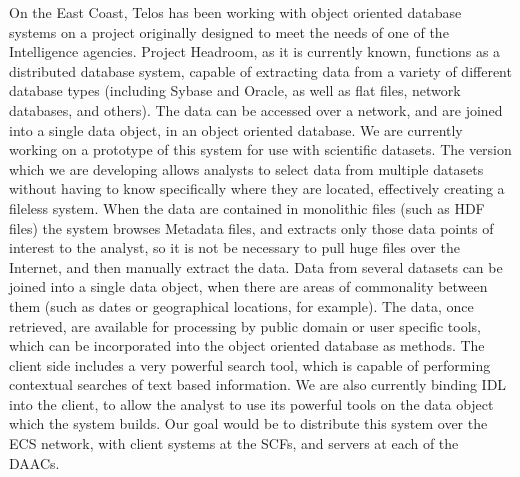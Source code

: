   	On the East Coast, Telos has been working with object oriented
  database systems on a project originally designed to meet the needs of one
  of the Intelligence agencies.  Project Headroom, as it is currently known,
  functions as a distributed database system, capable of extracting data from
  a variety of different database types (including Sybase and Oracle, as well
  as flat files, network databases, and others). The data can be accessed
  over a network, and are joined into a single data object, in an object
  oriented database.  We are currently working on a prototype of this system
  for use with scientific datasets. The version which we are developing
  allows analysts to select data from multiple datasets without having to
  know specifically where they are located, effectively creating a fileless
  system.  When the data are contained in monolithic files (such as HDF
  files) the system browses Metadata files, and extracts only those data
  points of interest to the analyst, so it is not be necessary to pull huge
  files over the Internet, and then manually extract the data.  Data from
  several datasets can be joined into a single data object, when there are
  areas of commonality between them (such as dates or geographical locations,
  for example). The data, once retrieved, are available for processing by
  public domain or user specific tools, which can be incorporated into the
  object oriented database as methods.  The client side includes a very
  powerful search tool, which is capable of performing contextual searches of
  text based information. We are also currently binding IDL into the client,
  to allow the analyst to use its powerful tools on the data object which the
  system builds.  Our goal would be to distribute this system over the ECS
  network, with client systems at the SCFs, and servers at each of the DAACs.

\newpage




